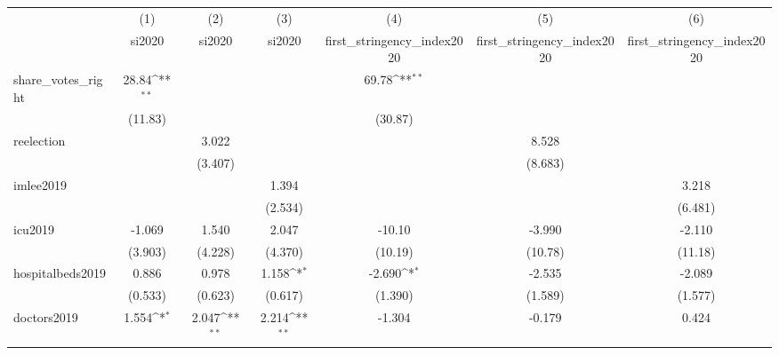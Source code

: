 {
\def\sym#1{\ifmmode^{#1}\else\(^{#1}\)\fi}
\begin{tabular}{l*{6}{c}}
\hline\hline
            &\multicolumn{1}{c}{(1)}&\multicolumn{1}{c}{(2)}&\multicolumn{1}{c}{(3)}&\multicolumn{1}{c}{(4)}&\multicolumn{1}{c}{(5)}&\multicolumn{1}{c}{(6)}\\
            &\multicolumn{1}{c}{si2020}&\multicolumn{1}{c}{si2020}&\multicolumn{1}{c}{si2020}&\multicolumn{1}{c}{first\_stringency\_index2020}&\multicolumn{1}{c}{first\_stringency\_index2020}&\multicolumn{1}{c}{first\_stringency\_index2020}\\
\hline
share\_votes\_right&       28.84\sym{**} &                     &                     &       69.78\sym{**} &                     &                     \\
            &     (11.83)         &                     &                     &     (30.87)         &                     &                     \\
[1em]
reelection  &                     &       3.022         &                     &                     &       8.528         &                     \\
            &                     &     (3.407)         &                     &                     &     (8.683)         &                     \\
[1em]
imlee2019   &                     &                     &       1.394         &                     &                     &       3.218         \\
            &                     &                     &     (2.534)         &                     &                     &     (6.481)         \\
[1em]
icu2019     &      -1.069         &       1.540         &       2.047         &      -10.10         &      -3.990         &      -2.110         \\
            &     (3.903)         &     (4.228)         &     (4.370)         &     (10.19)         &     (10.78)         &     (11.18)         \\
[1em]
hospitalbeds2019 &       0.886         &       0.978         &       1.158\sym{*}  &      -2.690\sym{*}  &      -2.535         &      -2.089         \\
            &     (0.533)         &     (0.623)         &     (0.617)         &     (1.390)         &     (1.589)         &     (1.577)         \\
[1em]
doctors2019 &       1.554\sym{*}  &       2.047\sym{**} &       2.214\sym{**} &      -1.304         &      -0.179         &       0.424         \\

\end{tabular}}
